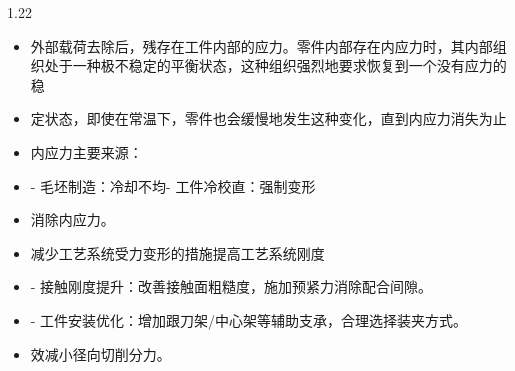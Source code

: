 \documentclass[12pt,a4paper]{article}
\begin{document}
\begin{spacing}{1.22}
\begin{itemize}[leftmargin=2.2em,label=--]
  \item 外部载荷去除后，残存在工件内部的应力。零件内部存在内应力时，其内部组织处于一种极不稳定的平衡状态，这种组织强烈地要求恢复到一个没有应力的稳
  \item 定状态，即使在常温下，零件也会缓慢地发生这种变化，直到内应力消失为止
  \item 内应力主要来源：
  \item - 毛坯制造：冷却不均- 工件冷校直：强制变形
  \item 消除内应力。
  \item 减少工艺系统受力变形的措施提高工艺系统刚度
  \item - 接触刚度提升：改善接触面粗糙度，施加预紧力消除配合间隙。
  \item - 工件安装优化：增加跟刀架/中心架等辅助支承，合理选择装夹方式。
  \item 效减小径向切削分力。
\end{itemize}


\end{spacing}
\end{document}
